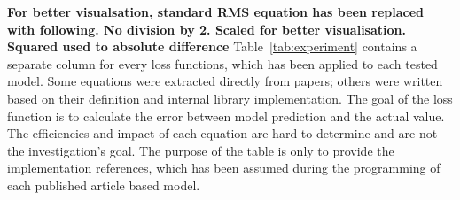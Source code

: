 \textbf{For better visualsation, standard RMS equation has been replaced with following. No division by 2. Scaled for better visualisation. Squared used to absolute difference}
\mbox{Table~\ref{tab:experiment}} contains a separate column for every loss functions, which has been applied to each tested model.
Some equations were extracted directly from papers; others were written based on their definition and internal library implementation.
The goal of the loss function is to calculate the error between model prediction and the actual value.
The efficiencies and impact of each equation are hard to determine and are not the investigation's goal.
The purpose of the table is only to provide the implementation references, which has been assumed during the programming of each published article based model.

